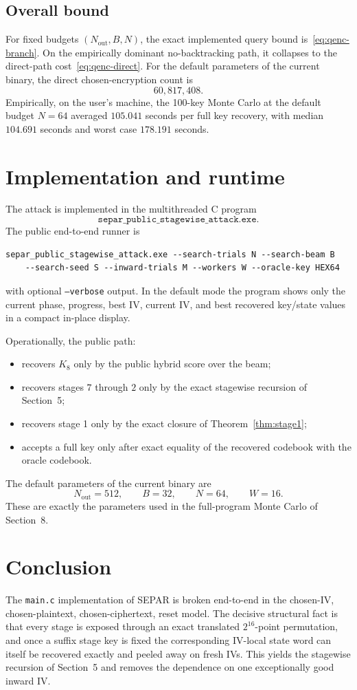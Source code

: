 \documentclass[11pt]{article}
\begin{document}
\subsection{Overall bound}
For fixed budgets $(N_{\mathrm{out}},B,N)$, the exact implemented query bound is~\eqref{eq:qenc-branch}. On the empirically dominant no-backtracking path, it collapses to the direct-path cost~\eqref{eq:qenc-direct}. For the default parameters of the current binary, the direct chosen-encryption count is
\[
60{,}817{,}408.
\]
Empirically, on the user's machine, the 100-key Monte Carlo at the default budget $N=64$ averaged $105.041$ seconds per full key recovery, with median $104.691$ seconds and worst case $178.191$ seconds.

\section{Implementation and runtime}
The attack is implemented in the multithreaded C program
\[
\texttt{separ\_public\_stagewise\_attack.exe}.
\]
The public end-to-end runner is
\begin{verbatim}
separ_public_stagewise_attack.exe --search-trials N --search-beam B
    --search-seed S --inward-trials M --workers W --oracle-key HEX64
\end{verbatim}
with optional \texttt{--verbose} output. In the default mode the program shows only the current phase, progress, best IV, current IV, and best recovered key/state values in a compact in-place display.

Operationally, the public path:
\begin{itemize}[leftmargin=1.5em]
\item recovers $K_8$ only by the public hybrid score over the beam;
\item recovers stages $7$ through $2$ only by the exact stagewise recursion of Section~5;
\item recovers stage 1 only by the exact closure of Theorem~\ref{thm:stage1};
\item accepts a full key only after exact equality of the recovered codebook with the oracle codebook.
\end{itemize}

The default parameters of the current binary are
\[
N_{\mathrm{out}}=512,\qquad B=32,\qquad N=64,\qquad W=16.
\]
These are exactly the parameters used in the full-program Monte Carlo of Section~8.

\section{Conclusion}
The \texttt{main.c} implementation of SEPAR is broken end-to-end in the chosen-IV, chosen-plaintext, chosen-ciphertext, reset model. The decisive structural fact is that every stage is exposed through an exact translated $2^{16}$-point permutation, and once a suffix stage key is fixed the corresponding IV-local state word can itself be recovered exactly and peeled away on fresh IVs. This yields the stagewise recursion of Section~5 and removes the dependence on one exceptionally good inward IV.
\end{document}

